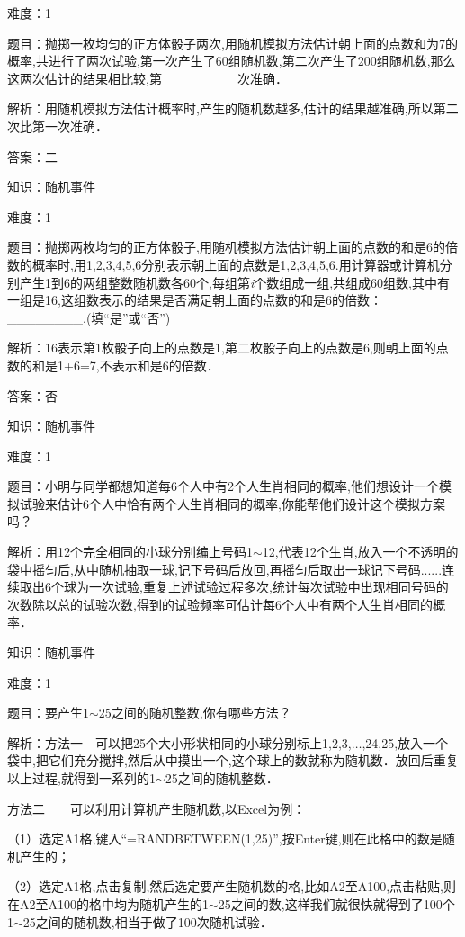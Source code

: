 \documentclass{article} %
\begin{document}
难度：1

题目：抛掷一枚均匀的正方体骰子两次,用随机模拟方法估计朝上面的点数和为7的概率,共进行了两次试验,第一次产生了60组随机数,第二次产生了200组随机数,那么这两次估计的结果相比较,第\_\_\_\_\_\_\_\_次准确．

解析：用随机模拟方法估计概率时,产生的随机数越多,估计的结果越准确,所以第二次比第一次准确．

答案：二

知识：随机事件

难度：1

题目：抛掷两枚均匀的正方体骰子,用随机模拟方法估计朝上面的点数的和是6的倍数的概率时,用1,2,3,4,5,6分别表示朝上面的点数是1,2,3,4,5,6.用计算器或计算机分别产生1到6的两组整数随机数各60个,每组第\textit{i}个数组成一组,共组成60组数,其中有一组是16,这组数表示的结果是否满足朝上面的点数的和是6的倍数：\_\_\_\_\_\_\_\_.(填``是''或``否'')

解析：16表示第1枚骰子向上的点数是1,第二枚骰子向上的点数是6,则朝上面的点数的和是1+6=7,不表示和是6的倍数．

答案：否

知识：随机事件

难度：1

题目：小明与同学都想知道每6个人中有2个人生肖相同的概率,他们想设计一个模拟试验来估计6个人中恰有两个人生肖相同的概率,你能帮他们设计这个模拟方案吗？

解析：用12个完全相同的小球分别编上号码1$\sim$12,代表12个生肖,放入一个不透明的袋中摇匀后,从中随机抽取一球,记下号码后放回,再摇匀后取出一球记下号码......连续取出6个球为一次试验,重复上述试验过程多次,统计每次试验中出现相同号码的次数除以总的试验次数,得到的试验频率可估计每6个人中有两个人生肖相同的概率．

知识：随机事件

难度：1

题目：要产生1$\sim$25之间的随机整数,你有哪些方法？

解析：方法一　可以把25个大小形状相同的小球分别标上1,2,3,$\dots$,24,25,放入一个袋中,把它们充分搅拌,然后从中摸出一个,这个球上的数就称为随机数．放回后重复以上过程,就得到一系列的1$\sim$25之间的随机整数．

方法二　　可以利用计算机产生随机数,以Excel为例：

（1）选定A1格,键入``=RANDBETWEEN(1,25)'',按Enter键,则在此格中的数是随机产生的；

（2）选定A1格,点击复制,然后选定要产生随机数的格,比如A2至A100,点击粘贴,则在A2至A100的格中均为随机产生的1$\sim$25之间的数,这样我们就很快就得到了100个1$\sim$25之间的随机数,相当于做了100次随机试验．
\end{document}
